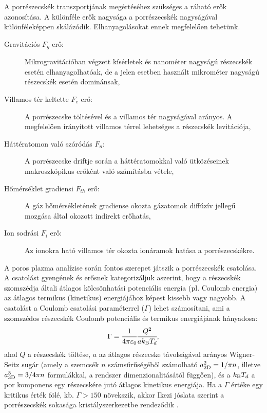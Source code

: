	A porrészecskék transzportjának megértéséhez szükséges a ráható erők azonosítása.
	A különféle erők nagysága a porrészecskék nagyságával különféleképpen skálázódik. Elhanyagolásokat
	ennek megfelelően tehetünk.
	\begin{description}
		\item[Gravitációs $F_g$ erő:] Mikrogravitációban végzett kísérletek és nanométer nagyságú részecskék esetén
			elhanyagolhatóak, de a jelen esetben használt mikrométer nagyságú részecskék esetén dominánsak,
		\item[Villamos tér keltette $F_e$ erő:] A porrészecske töltésével és a villamos tér nagyságával
			arányos. A megfelelően irányított villamos térrel lehetséges a részecskék levitációja,  
		\item[Háttératomon való szóródás $F_n$:] A porrészecske driftje során a háttératomokkal való
			ütközéseinek makroszkópikus erőként való számításba vétele,
		\item[Hőmérséklet gradiensi $F_{th}$ erő:] A gáz hőmérsékletének gradiense okozta
			gázatomok diffúzív jellegű mozgása által okozott indirekt erőhatás,
		\item[Ion sodrási $F_i$ erő:] Az ionokra ható villamos
                  tér okozta ionáramok hatása a
			porrészecskékre.
	\end{description}
	A poros plazma analízise során fontos szerepet játszik a porrészecskék csatolása.
	A csatolást gyengének és erősnek kategorizáljuk aszerint, hogy a részecskék szomszédja általi
	átlagos kölcsönhatási potenciális energia (pl. Coulomb
        energia) az átlagos termikus (kinetikus) energiájához képest kissebb vagy
	nagyobb.
	A csatolást a Coulomb csatolási paraméterrel ($\Gamma$) lehet számosítani, ami a szomszédos
	részecskék Coulomb potenciális és termikus energiájának hányadosa:
	\begin{equation}
		\Gamma = \cfrac{1}{4\pi\varepsilon_0}
                \cfrac{Q^2}{ak_{\rm B}T_d},
	\end{equation}
	ahol $Q$ a részecskék töltése, $a$ az átlagos részecske
        távolságával arányos Wigner-Seitz sugár (amely a
          szemcsék $n$ számsűrűségéből számolható $a^2_{\rm 2D}=1/\pi n$,
          illetve $a^3_{\rm 3D}=3/4\pi n$ formulákkal, a rendszer
          dimenzionalitásától függően), és a $k_{\rm B}T_d$ a por
        komponens egy részecskére jutó átlagos kinetikus energiája.
	Ha a $\Gamma$ értéke egy kritikus érték fölé, kb. $\Gamma > 150$ növekszik, akkor
	Ikezi jóslata szerint a porrészecskék sokasága
        kristályszerkezetbe rendeződik \cite{Ikezi1986}.
	

